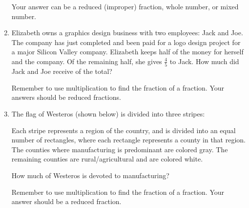 \documentclass[letterpaper,12pt,fleqn]{article}
\begin{document}
\begin{enumerate}
  Your answer can be a reduced (improper) fraction, whole number, or mixed
  number.

\item Elizabeth owns a graphics design business with two employees: Jack and
  Joe. The company has just completed and been paid for a logo design project
  for a major Silicon Valley company. Elizabeth keeps half of the money for
  herself and the company. Of the remaining half, she gives $\frac{4}{5}$ to
  Jack. How much did Jack and Joe receive of the total?

  Remember to use multiplication to find the fraction of a fraction. Your
  answers should be reduced fractions.

\item The flag of Westeros (shown below) is divided into three stripes:

  \bigskip

  \begin{figure}[h]
    \centering
  \end{figure}

  Each stripe represents a region of the country, and is divided into an equal
  number of rectangles, where each rectangle represents a county in that
  region. The counties where manufacturing is predominant are colored gray. The
  remaining counties are rural/agricultural and are colored white. 

  How much of Westeros is devoted to manufacturing?

  Remember to use multiplication to find the fraction of a fraction. Your
  answer should be a reduced fraction. 
\end{enumerate}
\end{document}
